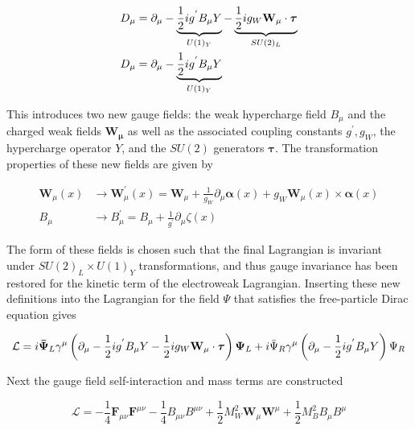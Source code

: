 \begin{align} 
\label{eq:gsw:left} 
D_\mu &= \partial_{\mu}
- \underbrace{\frac{1}{2}ig^{'}B_{\mu}Y}_{U(1)_Y} -
  \underbrace{\frac{1}{2}ig_{W}\bf{W}_\mu \cdot \boldsymbol{\tau}}_{SU(2)_L} \\
\label{eq:gsw:right} 
D_\mu &= \partial_{\mu}  - \underbrace{\frac{1}{2}ig^{'}B_{\mu}Y}_{U(1)_Y} 
\end{align}

This introduces two new gauge fields: the weak hypercharge field $B_\mu$ and
the charged weak fields $\boldsymbol{W_\mu}$ as well as the associated coupling
constants $g^{'}, g_{W}$, the hypercharge operator $Y$, and the $SU(2)$
generators $\boldsymbol{\tau}$.  The transformation properties of these new
fields are given by

\begin{align}
\label{eq:gsw:w_transform}
\boldsymbol{W}_{\mu}(x) &\rightarrow \boldsymbol{W}_{\mu}^{'}(x) =
\boldsymbol{W}_{\mu} + \frac{1}{g_{W}}\partial_{\mu} \boldsymbol{\alpha}(x) +
g_{W}\boldsymbol{W}_{\mu}(x) \times \boldsymbol{\alpha}(x)
\\ 
\label{eq:gsw:b_transform}
B_{\mu} &\rightarrow B_{\mu}^{'} = B_{\mu} +
\frac{1}{g^{'}}\partial_{\mu}\zeta(x)
\end{align}

The form of these fields is chosen such that the final Lagrangian is invariant
under $SU(2)_L \times U(1)_Y$ transformations, and thus gauge invariance has
been restored for the kinetic term of the electroweak Lagrangian.  Inserting
these new definitions into the Lagrangian for the field $\Psi$ that satisfies
the free-particle Dirac equation gives

\begin{equation} \label{eq:gsw:fermion_lagrangian}
\mathcal{L} = i\boldsymbol{\bar{\Psi}}_{L}\gamma^{\mu} \left( \partial_{\mu}
- \frac{1}{2}ig^{'}B_{\mu}Y - \frac{1}{2}ig_{W}\bf{W}_\mu \cdot
  \boldsymbol{\tau} \right) \boldsymbol{\Psi}_{L} + i \bar{\Psi}_{R}\gamma^{\mu}
\left(\partial_{\mu} - \frac{1}{2}ig^{'}B_{\mu}Y \right) \Psi_{R}
\end{equation}

Next the gauge field self-interaction and mass terms are constructed

\begin{equation} \label{eq:gsw:gauge_lagrangian}
\mathcal{L} = -\frac{1}{4}\boldsymbol{F}_{\mu\nu}\boldsymbol{F}^{\mu\nu}
-\frac{1}{4}B_{\mu\nu}B^{\mu\nu} +
\frac{1}{2}M_{W}^{2}\boldsymbol{W}_{\mu}\boldsymbol{W}^{\mu} +
\frac{1}{2}M_{B}^{2}B_{\mu}B^{\mu}
\end{equation}

